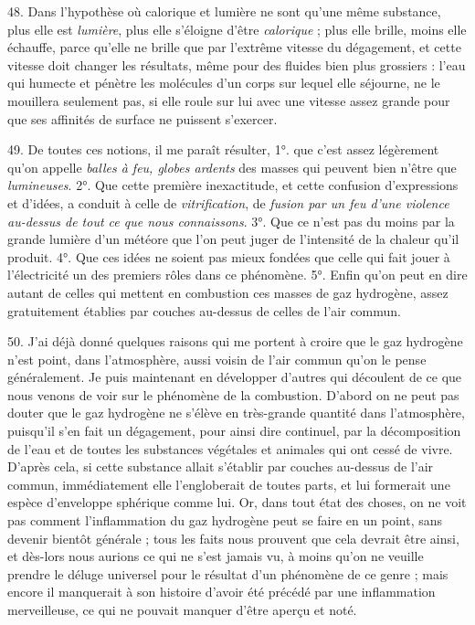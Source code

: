 \documentclass[a4paper, 11pt, oneside, polutonikogreek, french]{article}
\begin{document}
48. Dans l'hypothèse où calorique et lumière ne sont qu'une même substance, plus elle est \emph{lumière}, plus elle s'éloigne d'être \emph{calorique} ; plus elle brille, moins elle échauffe, parce qu'elle ne brille que par l'extrême vitesse du dégagement, et cette vitesse doit changer les résultats, même pour des fluides bien plus grossiers : l'eau qui humecte et pénètre les molécules d'un corps sur lequel elle séjourne, ne le mouillera seulement pas, si elle roule sur lui avec une vitesse assez grande pour que ses affinités de surface ne puissent s'exercer.

49. De toutes ces notions, il me paraît résulter, 1°. que c'est assez légèrement qu'on appelle \emph{balles à feu, globes ardents} des masses qui peuvent bien n'être que \emph{lumineuses}. 2°. Que cette première inexactitude, et cette confusion d'expressions et d'idées, a conduit à celle de \emph{vitrification}, de \emph{fusion par un feu d'une violence au-dessus de tout ce que nous connaissons}. 3°. Que ce n'est pas du moins par la grande lumière d'un météore que l'on peut juger de l'intensité de la chaleur qu'il produit. 4°. Que ces idées ne soient pas mieux fondées que celle qui fait jouer à l'électricité un des premiers rôles dans ce phénomène. 5°. Enfin qu'on peut en dire autant de celles qui mettent en combustion ces masses de gaz hydrogène, assez gratuitement établies par couches au-dessus de celles de l'air commun.

50. J'ai déjà donné quelques raisons qui me portent à croire que le gaz hydrogène n'est point, dans l'atmosphère, aussi voisin de l'air commun qu'on le pense généralement. Je puis maintenant en développer d'autres qui découlent de ce que nous venons de voir sur le phénomène de la combustion. D'abord on ne peut pas douter que le gaz hydrogène ne s'élève en très-grande quantité dans l'atmosphère, puisqu'il s'en fait un dégagement, pour ainsi dire continuel, par la décomposition de l'eau et de toutes les substances végétales et animales qui ont cessé de vivre. D'après cela, si cette substance allait s'établir par couches au-dessus de l'air commun, immédiatement elle l'engloberait de toutes parts, et lui formerait une espèce d'enveloppe sphérique comme lui. Or, dans tout état des choses, on ne voit pas comment l'inflammation du gaz hydrogène peut se faire en un point, sans devenir bientôt générale ; tous les faits nous prouvent que cela devrait être ainsi, et dès-lors nous aurions ce qui ne s'est jamais vu, à moins qu'on ne veuille prendre le déluge universel pour le résultat d'un phénomène de ce genre ; mais encore il manquerait à son histoire d'avoir été précédé par une inflammation merveilleuse, ce qui ne pouvait manquer d'être aperçu et noté.
\end{document}
